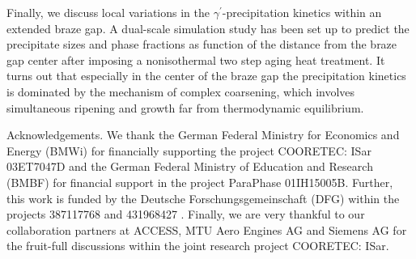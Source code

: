 \documentclass[10pt]{article}
\begin{document}
Finally, we discuss local variations in the $\gamma^{\prime}$-precipitation kinetics within an extended braze gap. A dual-scale simulation study has been set up to predict the precipitate sizes and phase fractions as function of the distance from the braze gap center after imposing a nonisothermal two step aging heat treatment. It turns out that especially in the center of the braze gap the precipitation kinetics is dominated by the mechanism of complex coarsening, which involves simultaneous ripening and growth far from thermodynamic equilibrium.

Acknowledgements. We thank the German Federal Ministry for Economics and Energy (BMWi) for financially supporting the project COORETEC: ISar 03ET7047D and the German Federal Ministry of Education and Research (BMBF) for financial support in the project ParaPhase 01IH15005B. Further, this work is funded by the Deutsche Forschungsgemeinschaft (DFG) within the projects 387117768 and 431968427 . Finally, we are very thankful to our collaboration partners at ACCESS, MTU Aero Engines AG and Siemens AG for the fruit-full discussions within the joint research project COORETEC: ISar.
\end{document}
